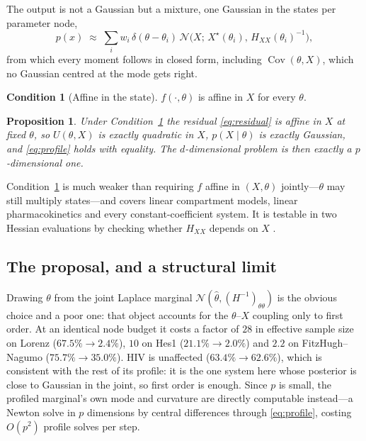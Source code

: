 \documentclass[11pt]{article}
\theoremstyle{plain}
\newtheorem{proposition}{Proposition}
\theoremstyle{definition}
\newtheorem{condition}{Condition}
\theoremstyle{remark}
\begin{document}
The output is not a Gaussian but a mixture, one Gaussian in the states per parameter node,
\[
  p(x) \;\approx\; \sum_i w_i\, \delta(\theta - \theta_i)\,
  \mathcal N\!\big(X;\, X^\star(\theta_i),\, H_{XX}(\theta_i)^{-1}\big),
\]
from which every moment follows in closed form, including $\operatorname{Cov}(\theta, X)$, which no
Gaussian centred at the mode gets right.

\begin{condition}[Affine in the state]
\label{cond:A}
$f(\cdot,\theta)$ is affine in $X$ for every $\theta$.
\end{condition}

\begin{proposition}
Under Condition~\ref{cond:A} the residual \eqref{eq:residual} is affine in $X$ at fixed $\theta$,
so $U(\theta, X)$ is exactly quadratic in $X$, $p(X\mid\theta)$ is exactly Gaussian, and
\eqref{eq:profile} holds with equality. The $d$-dimensional problem is then exactly a
$p$-dimensional one.
\end{proposition}

Condition~\ref{cond:A} is much weaker than requiring $f$ affine in $(X,\theta)$ jointly---$\theta$
may still multiply states---and covers linear compartment models, linear pharmacokinetics and every
constant-coefficient system. It is testable in two Hessian evaluations by checking whether $H_{XX}$
depends on $X$ \cite{companion}.

\subsection{The proposal, and a structural limit}

Drawing $\theta$ from the joint Laplace marginal $\mathcal N(\hat\theta, (H^{-1})_{\theta\theta})$
is the obvious choice and a poor one: that object accounts for the $\theta$--$X$ coupling only to
first order. At an identical node budget it costs a factor of $28$ in effective sample size on
Lorenz ($67.5\% \to 2.4\%$), $10$ on Hes1 ($21.1\% \to 2.0\%$) and $2.2$ on FitzHugh--Nagumo
($75.7\% \to 35.0\%$). HIV is unaffected ($63.4\% \to 62.6\%$), which is consistent with the rest
of its profile: it is the one system here whose posterior is close to Gaussian in the joint, so
first order is enough. Since $p$ is small, the profiled marginal's own mode and curvature are
directly computable instead---a Newton solve in $p$ dimensions by central differences through
\eqref{eq:profile}, costing $O(p^2)$ profile solves per step.
\end{document}
